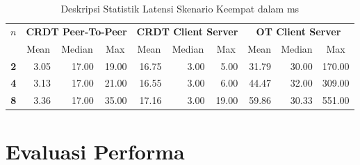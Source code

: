 \begin{table}[H]
 \centering
 \caption{Deskripsi Statistik Latensi Skenario Keempat dalam ms}
\begin{tabular}{|c|rrr|rrr|rrr|}
\hline
\multirow{2}{*}{$n$} & \multicolumn{3}{c|}{\textbf{CRDT Peer-To-Peer}} & \multicolumn{3}{c|}{\textbf{CRDT Client Server}} & \multicolumn{3}{c|}{\textbf{OT Client Server}} \\ \cline{2-10}
 & \multicolumn{1}{c|}{Mean} & \multicolumn{1}{c|}{Median} & \multicolumn{1}{c|}{Max} & \multicolumn{1}{c|}{Mean} & \multicolumn{1}{c|}{Median} & \multicolumn{1}{c|}{Max} & \multicolumn{1}{c|}{Mean} & \multicolumn{1}{c|}{Median} & \multicolumn{1}{c|}{Max} \\ \hline
\textbf{2} & \multicolumn{1}{r|}{3.05} & \multicolumn{1}{r|}{17.00} & 19.00 & \multicolumn{1}{r|}{16.75} & \multicolumn{1}{r|}{3.00} & 5.00 & \multicolumn{1}{r|}{31.79} & \multicolumn{1}{r|}{30.00} & 170.00 \\ \hline
\textbf{4} & \multicolumn{1}{r|}{3.13} & \multicolumn{1}{r|}{17.00} & 21.00 & \multicolumn{1}{r|}{16.55} & \multicolumn{1}{r|}{3.00} & 6.00 & \multicolumn{1}{r|}{44.47} & \multicolumn{1}{r|}{32.00} & 309.00 \\ \hline
\textbf{8} & \multicolumn{1}{r|}{3.36} & \multicolumn{1}{r|}{17.00} & 35.00 & \multicolumn{1}{r|}{17.16} & \multicolumn{1}{r|}{3.00} & 19.00 & \multicolumn{1}{r|}{59.86} & \multicolumn{1}{r|}{30.33} & 551.00 \\ \hline
\end{tabular}
\end{table}

\section{Evaluasi Performa}